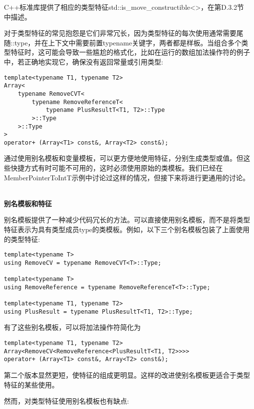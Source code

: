 C++标准库提供了相应的类型特征std::is\_move\_constructible<>，在第D.3.2节中描述。


对于类型特征的常见抱怨是它们非常冗长，因为类型特征的每次使用通常需要尾随::type，并在上下文中需要前置typename关键字，两者都是样板。当组合多个类型特征时，这可能会导致一些尴尬的格式化，比如在运行的数组加法操作符的例子中，若正确地实现它，确保没有返回常量或引用类型:

\begin{lstlisting}[style=styleCXX]
template<typename T1, typename T2>
Array<
	typename RemoveCVT<
		typename RemoveReferenceT<
			typename PlusResultT<T1, T2>::Type
		>::Type
	>::Type
>
operator+ (Array<T1> const&, Array<T2> const&);
\end{lstlisting}

通过使用别名模板和变量模板，可以更方便地使用特征，分别生成类型或值。但这些快捷方式有时可能不可用的，这时必须使用原始的类模板。我们已经在MemberPointerToIntT示例中讨论过这样的情况，但接下来将进行更通用的讨论。

\hspace*{\fill} \\ %
\noindent
\textbf{别名模板和特征}

别名模板提供了一种减少代码冗长的方法。可以直接使用别名模板，而不是将类型特征表示为具有类型成员type的类模板。例如，以下三个别名模板包装了上面使用的类型特征:

\begin{lstlisting}[style=styleCXX]
template<typename T>
using RemoveCV = typename RemoveCVT<T>::Type;

template<typename T>
using RemoveReference = typename RemoveReferenceT<T>::Type;

template<typename T1, typename T2>
using PlusResult = typename PlusResultT<T1, T2>::Type;
\end{lstlisting}

有了这些别名模板，可以将加法操作符简化为

\begin{lstlisting}[style=styleCXX]
template<typename T1, typename T2>
Array<RemoveCV<RemoveReference<PlusResultT<T1, T2>>>>
operator+ (Array<T1> const&, Array<T2> const&);
\end{lstlisting}

第二个版本显然更短，使特征的组成更明显。这样的改进使别名模板更适合于类型特征的某些使用。

然而，对类型特征使用别名模板也有缺点:

